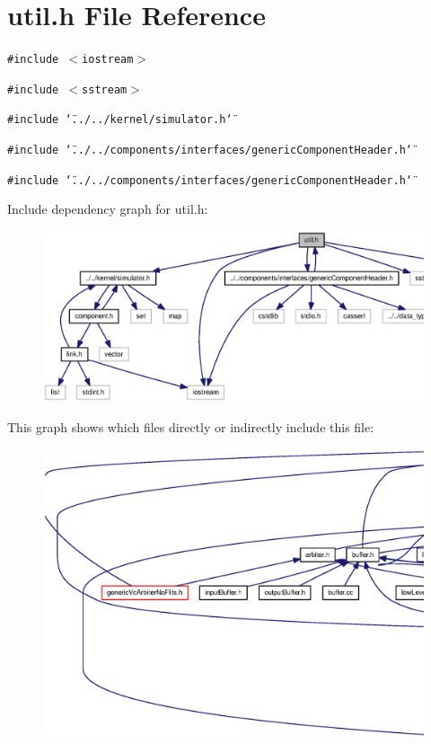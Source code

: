 \section{util.h File Reference}
\label{util_8h}
{\tt \#include $<$iostream$>$}\par
{\tt \#include $<$sstream$>$}\par
{\tt \#include \char`\"{}../../kernel/simulator.h\char`\"{}}\par
{\tt \#include \char`\"{}../../components/interfaces/genericComponentHeader.h\char`\"{}}\par
{\tt \#include \char`\"{}../../components/interfaces/genericComponentHeader.h\char`\"{}}\par


Include dependency graph for util.h:\nopagebreak
\begin{figure}[H]
\begin{center}
\leavevmode
\includegraphics[width=420pt]{util_8h__incl}
\end{center}
\end{figure}


This graph shows which files directly or indirectly include this file:\nopagebreak
\begin{figure}[H]
\begin{center}
\leavevmode
\includegraphics[width=420pt]{util_8h__dep__incl}
\end{center}
\end{figure}
